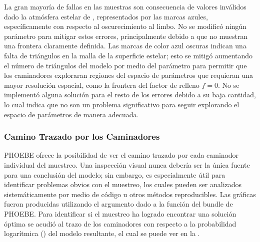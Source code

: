 La gran mayoría de fallas en las muestras son consecuencia de valores inválidos
dado la atmósfera estelar de
, representados por
las marcas azules, específicamente con respecto al oscurecimiento al limbo. No
se modificó ningún parámetro para mitigar estos errores, principalmente debido a
que no muestran una frontera claramente definida. Las marcas de color azul
oscuras indican una falta de triángulos en la malla de la superficie estelar;
esto se mitigó aumentando el número de triángulos del modelo por medio del
parámetro  para permitir que los caminadores exploraran
regiones del espacio de parámetros que requieran una mayor resolución espacial,
como la frontera del factor de relleno $f = 0$. No se implementó alguna solución
para el resto de los errores debido a su baja cantidad, lo cual indica que no
son un problema significativo para seguir explorando el espacio de parámetros de
manera adecuada. 

\subsubsection{Camino Trazado por los Caminadores}

PHOEBE ofrece la posibilidad de ver el camino trazado por cada caminador
individual del muestreo. Una inspección visual nunca debería ser la única fuente
para una conclusión del modelo; sin embargo, es especialmente útil para
identificar problemas obvios con el muestreo, los cuales pueden ser analizados
sistemáticamente por medio de código u otros métodos reproducibles. Las gráficas
fueron producidas utilizando el argumento  dado a la función
 del bundle de PHOEBE. Para identificar si el muestreo ha logrado
encontrar una solución óptima se acudió al trazo de los caminadores con respecto
a la probabilidad logarítmica () del modelo resultante, el
cual se puede ver en la .

